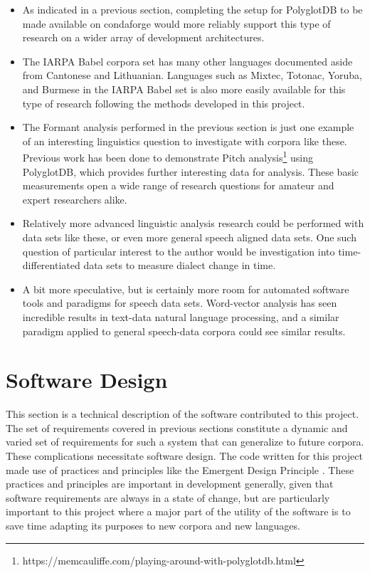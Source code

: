 \documentclass[11pt]{article}
\begin{document}
\begin{itemize}
  \item As indicated in a previous section, completing the setup for PolyglotDB to be made available on condaforge would more reliably support this type of research on a wider array of development architectures.
  \item The IARPA Babel corpora set has many other languages documented aside from Cantonese and Lithuanian. Languages such as Mixtec, Totonac, Yoruba, and Burmese in the IARPA Babel set is also more easily available for this type of research following the methods developed in this project.
  \item The Formant analysis performed in the previous section is just one example of an interesting linguistics question to investigate with corpora like these. Previous work has been done to demonstrate Pitch analysis\footnote{https://memcauliffe.com/playing-around-with-polyglotdb.html} using PolyglotDB, which provides further interesting data for analysis. These basic measurements open a wide range of research questions for amateur and expert researchers alike.
  \item Relatively more advanced linguistic analysis research could be performed with data sets like these, or even more general speech aligned data sets. One such question of particular interest to the author would be investigation into time-differentiated data sets to measure dialect change in time.
  \item A bit more speculative, but is certainly more room for automated software tools and paradigms for speech data sets. Word-vector analysis has seen incredible results in text-data natural language processing, and a similar paradigm applied to general speech-data corpora could see similar results.
\end{itemize}

\section{Software Design}
This section is a technical description of the software contributed to this project. The set of requirements covered in previous sections constitute a dynamic and varied set of requirements for such a system that can generalize to future corpora. These complications necessitate software design. The code written for this project made use of practices and principles like the Emergent Design Principle \cite{bain_emergent_2008}. These practices and principles are important in development generally, given that software requirements are always in a state of change, but are particularly important to this project where a major part of the utility of the software is to save time adapting its purposes to new corpora and new languages. 
\end{document}
